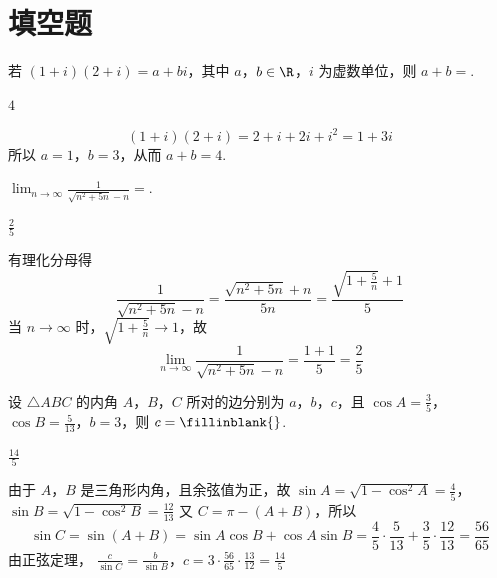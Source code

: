 \section{填空题}

\begin{problem}
若 \( (1 + i)(2 + i) = a + bi \)，其中 \(a\)，\(b \in \R\)，\(i\) 为虚数单位，则 \( a + b = \)\fillinblank{}.

\begin{answer}
\(4\)
\end{answer}

\begin{solution}
\[
(1+i)(2+i)=2+i+2i+i^{2}=1+3i
\]
所以 \(a=1\)，\(b=3\)，从而 \(a+b=4\).
\end{solution}
\end{problem}

\begin{problem}
\(\displaystyle\lim_{n\to\infty}\frac{1}{\sqrt{n^2 + 5n} - n}=\)\fillinblank{}.

\begin{answer}
\(\frac{2}{5}\)
\end{answer}

\begin{solution}
有理化分母得
\[
\frac{1}{\sqrt{n^{2}+5n}-n}
=\frac{\sqrt{n^{2}+5n}+n}{5n}
=\frac{\sqrt{1+\frac5n}+1}{5}
\]
当 \(n\to\infty\) 时，\(\sqrt{1+\frac5n}\to1\)，故
\[
\displaystyle\lim_{n\to\infty}\frac{1}{\sqrt{n^{2}+5n}-n}
=\frac{1+1}{5}=\frac25
\]
\end{solution}
\end{problem}

\begin{problem}
设 \(\triangle ABC\) 的内角 \(A\)，\(B\)，\(C\) 所对的边分别为 \(a\)，\(b\)，\(c\)，且 \(\cos A = \frac{3}{5}\)，\(\cos B = \frac{5}{13}\)，\(b = 3\)，则 \(c =\fillinblank{}\).

\begin{answer}
\(\frac{14}{5}\)
\end{answer}

\begin{solution}
由于 \(A\)，\(B\) 是三角形内角，且余弦值为正，故
\(\sin A=\sqrt{1-\cos^{2}A}=\frac45\)，\(\sin B=\sqrt{1-\cos^{2}B}=\frac{12}{13}\)
又 \(C=\pi-(A+B)\)，所以
\[
\sin C=\sin(A+B)
=\sin A\cos B+\cos A\sin B
=\frac45\cdot\frac5{13}+\frac35\cdot\frac{12}{13}
=\frac{56}{65}
\]
由正弦定理，
\(\frac{c}{\sin C}=\frac{b}{\sin B}\)，\(c=3\cdot\frac{56}{65}\cdot\frac{13}{12}=\frac{14}{5}\)
\end{solution}
\end{problem}

